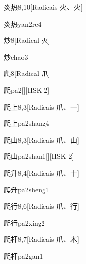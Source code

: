 \begin{entry}{炎热}{8,10}[Radicais ⽕、⽕]
  \begin{phonetics}{炎热}{yan2re4}
  \end{phonetics}
\end{entry}

\begin{entry}{炒}{8}[Radical ⽕]
  \begin{phonetics}{炒}{chao3}
  \end{phonetics}
\end{entry}

\begin{entry}{爬}{8}[Radical ⽖]
  \begin{phonetics}{爬}{pa2}[][HSK 2]
  \end{phonetics}
\end{entry}

\begin{entry}{爬上}{8,3}[Radicais ⽖、⼀]
  \begin{phonetics}{爬上}{pa2shang4}
  \end{phonetics}
\end{entry}

\begin{entry}{爬山}{8,3}[Radicais ⽖、⼭]
  \begin{phonetics}{爬山}{pa2shan1}[][HSK 2]
  \end{phonetics}
\end{entry}

\begin{entry}{爬升}{8,4}[Radicais ⽖、⼗]
  \begin{phonetics}{爬升}{pa2sheng1}
  \end{phonetics}
\end{entry}

\begin{entry}{爬行}{8,6}[Radicais ⽖、⾏]
  \begin{phonetics}{爬行}{pa2xing2}
  \end{phonetics}
\end{entry}

\begin{entry}{爬杆}{8,7}[Radicais ⽖、⽊]
  \begin{phonetics}{爬杆}{pa2gan1}
  \end{phonetics}
\end{entry}

